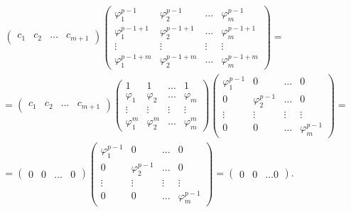 \begin{multline}~\label{direction:c_zeroing}
    \begin{pmatrix}
        c_1 & c_2 & \dots & c_{m+1}
    \end{pmatrix}
    \begin{pmatrix}
        \varphi_1^{p-1}   & \varphi_2^{p-1}   & \dots  & \varphi_m^{p-1}   \\
        \varphi_1^{p-1+1} & \varphi_2^{p-1+1} & \dots  & \varphi_m^{p-1+1} \\
        \vdots            & \vdots            & \vdots & \vdots            \\
        \varphi_1^{p-1+m} & \varphi_2^{p-1+m} & \dots  & \varphi_m^{p-1+m}
    \end{pmatrix} = \\
    = \begin{pmatrix}
        c_1 & c_2 & \dots & c_{m+1}
    \end{pmatrix}
    \begin{pmatrix}
        1           & 1           & \dots  & 1           \\
        \varphi_1   & \varphi_2   & \dots  & \varphi_m   \\
        \vdots      & \vdots      & \vdots & \vdots      \\
        \varphi_1^m & \varphi_2^m & \dots  & \varphi_m^m
    \end{pmatrix}
    \begin{pmatrix}
        \varphi_1^{p-1} & 0               & \dots  & 0               \\
        0               & \varphi_2^{p-1} & \dots  & 0               \\
        \vdots          & \vdots          & \vdots & \vdots          \\
        0               & 0               & \dots  & \varphi_m^{p-1}
    \end{pmatrix} = \\
    = \begin{pmatrix}
        0 & 0 & \dots & 0
    \end{pmatrix}
    \begin{pmatrix}
        \varphi_1^{p-1} & 0               & \dots  & 0               \\
        0               & \varphi_2^{p-1} & \dots  & 0               \\
        \vdots          & \vdots          & \vdots & \vdots          \\
        0               & 0               & \dots  & \varphi_m^{p-1}
    \end{pmatrix}
    = \begin{pmatrix}
        0 & 0 & \dots 0
    \end{pmatrix} .
\end{multline}

